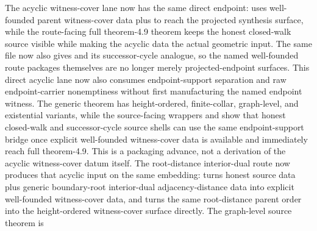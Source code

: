 \documentclass[11pt]{article}
\begin{document}
\begin{itemize}
The acyclic witness-cover lane now has the same direct endpoint:
uses well-founded parent witness-cover data plus
 to reach the projected synthesis surface,
while the route-facing full theorem-4.9 theorem
keeps the honest closed-walk source visible while making the acyclic data the
actual geometric input.  The same file now also gives
and its successor-cycle analogue, so the named well-founded route packages
themselves are no longer merely projected-endpoint surfaces.
This direct acyclic lane now also consumes endpoint-support separation and raw
endpoint-carrier nonemptiness without first manufacturing the named endpoint
witness.  The generic theorem
has height-ordered, finite-collar, graph-level, and existential variants, while
the source-facing wrappers
and
show that honest closed-walk and successor-cycle source shells can use the
same endpoint-support bridge once explicit well-founded witness-cover data is
available and immediately reach full theorem-4.9.  This is a packaging
advance, not a derivation of the acyclic witness-cover datum itself.
The root-distance interior-dual route now produces that acyclic input on the
same embedding:
turns honest source data plus generic boundary-root interior-dual
adjacency-distance data into explicit well-founded witness-cover data, and
turns the same root-distance parent order into the height-ordered
witness-cover surface directly.  The graph-level source theorem is

\end{itemize}
\end{document}
